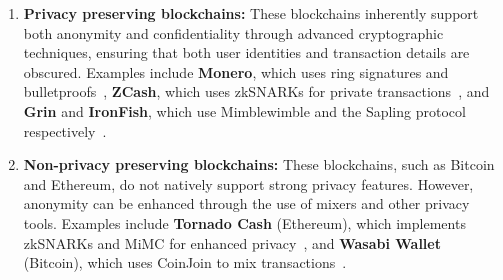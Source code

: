 \documentclass[pdftex,twocolumn,epjc3]{svjour3}
\begin{document}
\begin{sloppypar}
\begin{enumerate}
    \item \textbf{Privacy preserving blockchains:} These blockchains inherently support both anonymity and confidentiality through advanced cryptographic techniques, ensuring that both user identities and transaction details are obscured. Examples include \textbf{Monero}, which uses ring signatures and bulletproofs~\cite{vansaberhagenCryptoNote2013, noetherRingSignatureConfidential2015, bunzBulletproofsShortProofs2018}, \textbf{ZCash}, which uses zkSNARKs for private transactions~\cite{ben-sassonZerocashDecentralizedAnonymous2014}, and \textbf{Grin} and \textbf{IronFish}, which use Mimblewimble and the Sapling protocol respectively~\cite{jedusorMIMBLEWIMBLE2016,fuchsbauerAggregateCashSystems2019, hopwoodZcashSaplingProtocol2022, ironfishPrivateAnonymousEasy}.
    \item \textbf{Non-privacy preserving blockchains:} These blockchains, such as Bitcoin and Ethereum, do not natively support strong privacy features. However, anonymity can be enhanced through the use of mixers and other privacy tools. Examples include \textbf{Tornado Cash} (Ethereum), which implements zkSNARKs and MiMC for enhanced privacy~\cite{grothSizePairingbasedNoninteractive2016,pertsevTornadoCashPrivacy2019}, and \textbf{Wasabi Wallet} (Bitcoin), which uses CoinJoin to mix transactions~\cite{maxwellCoinJoinBitcoinPrivacy2013,wasabiwalletBitcoinPrivacyWallet}.
\end{enumerate}
\end{sloppypar}
\end{document}

